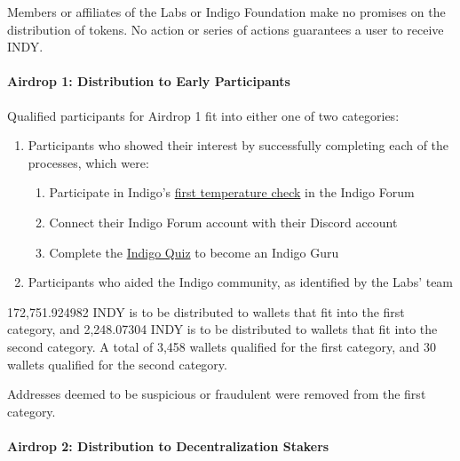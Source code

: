 \documentclass{article}
\begin{document}
\begin{sloppypar}
Members or affiliates of the Labs or Indigo Foundation make no promises
on the distribution of tokens. No action or series of actions guarantees
a user to receive INDY.

\hypertarget{airdrop-1-distribution-to-early-participants}{%
\paragraph{Airdrop 1: Distribution to Early
Participants}\label{airdrop-1-distribution-to-early-participants}}

Qualified participants for Airdrop 1 fit into either one of two
categories:

\begin{enumerate}
\item
  Participants who showed their interest by successfully completing each
  of the processes, which were:

  \begin{enumerate}
  \item
    Participate in Indigo's
    \href{https://forum.indigoprotocol.io/t/indigo-initial-token-distribution-vote/1399}{first
    temperature check} in the Indigo Forum
  \item
    Connect their Indigo Forum account with their Discord account
  \item
    Complete the \href{https://quiz.indigoprotocol.io/}{Indigo Quiz} to
    become an Indigo Guru
  \end{enumerate}
\item
  Participants who aided the Indigo community, as identified by the
  Labs' team
\end{enumerate}

172,751.924982 INDY is to be distributed to wallets that fit into the
first category, and 2,248.07304 INDY is to be distributed to wallets
that fit into the second category. A total of 3,458 wallets qualified
for the first category, and 30 wallets qualified for the second
category.

Addresses deemed to be suspicious or fraudulent were removed from the
first category.

\hypertarget{airdrop-2-distribution-to-decentralization-stakers}{%
\paragraph{Airdrop 2: Distribution to Decentralization
Stakers}\label{airdrop-2-distribution-to-decentralization-stakers}}


\end{sloppypar}
\end{document}
